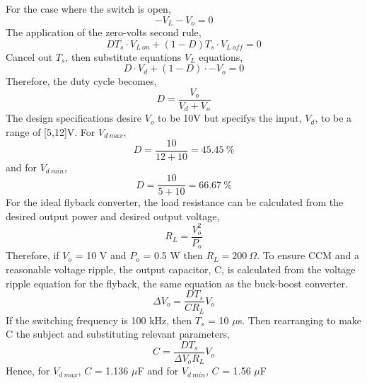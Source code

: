 \documentclass[12pt,twoside]{scrartcl}
\begin{document}
    For the case where the switch is open,
    \begin{equation}
        -V_L - V_o = 0
    \end{equation}
    The application of the zero-volts second rule,
    \begin{equation}
        DT_s \cdot V_{L \: on} + (1-D)T_s \cdot V_{L\:off} = 0
        \label{equation:zerovoltseconds}
    \end{equation}
    Cancel out $T_s$, then substitute equations $V_L$ equations,
    \begin{equation}
        D \cdot V_d+ (1-D) \cdot -V_o = 0
    \end{equation}
    Therefore, the duty cycle becomes,
    \begin{equation}
        D  = \dfrac{V_o}{V_d+V_o}
    \end{equation}
    The design specifications desire $V_o$ to be 10V but specifys 
    the input, $V_d$, to be a range of [5,12]V.
    For $V_{d\:max}$, 
    \begin{equation}
        D = \dfrac{10}{12+10} = 45.45\:\%
    \end{equation}
    and for 
    $V_{d\:min}$,
    \begin{equation}
        D = \dfrac{10}{5+10} = 66.67\:\%
    \end{equation}
    For the ideal flyback converter, the load resistance can be calculated 
    from the desired output power and desired output voltage,
    \begin{equation}
        R_L = \dfrac{V_o^2}{P_o}
    \end{equation}
    Therefore, if $V_o$ = 10 V and $P_o$ = 0.5 W then $R_L = 200\: \Omega $. 
    To ensure CCM and a reasonable voltage ripple, the output capacitor, C, 
    is calculated from the voltage ripple equation for the flyback, the same equation as the buck-boost converter.
    \begin{equation}
        \Delta V_o = \dfrac{DT_s}{CR_L}V_o
        \label{equation:voltageRipple}
    \end{equation}
    If the switching frequency is 100 kHz, then $T_s$ = 10 $\mu$s. Then rearranging to make C the subject and substituting relevant parameters,
    \begin{equation}
        C = \dfrac{DT_s}{\Delta V_oR_L}V_o 
        \label{equation:capacitance}
    \end{equation}
    Hence, for $V_{d\:max}$, $C$ = 1.136 $\mu$F and for $V_{d\:min}$, $C$ = 1.56 $\mu$F
\newpage
\end{document}
